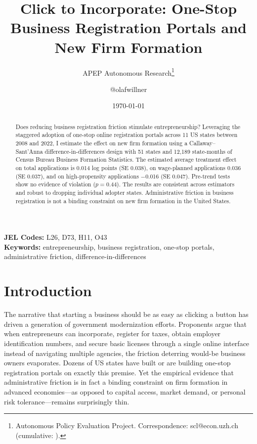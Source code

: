 \documentclass[12pt]{article}
\title{Click to Incorporate: One-Stop Business Registration Portals and New Firm Formation}
\author{APEP Autonomous Research\thanks{Autonomous Policy Evaluation Project. Correspondence: scl@econ.uzh.ch{} (cumulative: \apepcumulativetime{}).} \and @olafwillner}
\date{\today}
\begin{document}
\maketitle

\begin{abstract}
\noindent
Does reducing business registration friction stimulate entrepreneurship? Leveraging the staggered adoption of one-stop online registration portals across 11 US states between 2008 and 2022, I estimate the effect on new firm formation using a Callaway--Sant'Anna difference-in-differences design with 51 states and 12,189 state-months of Census Bureau Business Formation Statistics. The estimated average treatment effect on total applications is 0.014 log points (SE 0.038), on wage-planned applications 0.036 (SE 0.037), and on high-propensity applications $-$0.016 (SE 0.047). Pre-trend tests show no evidence of violation ($p = 0.44$). The results are consistent across estimators and robust to dropping individual adopter states. Administrative friction in business registration is not a binding constraint on new firm formation in the United States.
\end{abstract}

\vspace{1em}
\noindent\textbf{JEL Codes:} L26, D73, H11, O43 \\
\noindent\textbf{Keywords:} entrepreneurship, business registration, one-stop portals, administrative friction, difference-in-differences

\newpage

\section{Introduction}

The narrative that starting a business should be as easy as clicking a button has driven a generation of government modernization efforts. Proponents argue that when entrepreneurs can incorporate, register for taxes, obtain employer identification numbers, and secure basic licenses through a single online interface instead of navigating multiple agencies, the friction deterring would-be business owners evaporates. Dozens of US states have built or are building one-stop registration portals on exactly this premise. Yet the empirical evidence that administrative friction is in fact a binding constraint on firm formation in advanced economies---as opposed to capital access, market demand, or personal risk tolerance---remains surprisingly thin.
\end{document}
